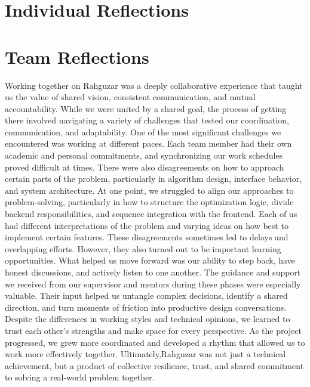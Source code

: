 \section{Individual Reflections}

\section{Team Reflections}
Working together on Rahguzar was a deeply collaborative experience that taught us the value of shared vision, consistent communication, and mutual accountability.
While we were united by a shared goal, the process of getting there involved navigating a variety of challenges that tested our coordination, communication, and adaptability. One of the most significant challenges we encountered was working at different paces. Each team member had their own academic and personal commitments, and synchronizing our work schedules proved difficult at times. There were also disagreements on how to approach certain parts of the problem, particularly in algorithm design, interface behavior, and system architecture.
At one point, we struggled to align our approaches to problem-solving, particularly in how to structure the optimization logic, divide backend responsibilities, and sequence integration with the frontend. Each of us had different interpretations of the problem and varying ideas on how best to implement certain features. These disagreements sometimes led to delays and overlapping efforts. However, they also turned out to be important learning opportunities. What helped us move forward was our ability to step back, have honest discussions, and actively listen to one another. The guidance and support we received from our supervisor and mentors during these phases were especially valuable. Their input helped us untangle complex decisions, identify a shared direction, and turn moments of friction into productive design conversations.
Despite the differences in working styles and technical opinions, we learned to trust each other’s strengths and make space for every perspective. As the project progressed, we grew more coordinated and developed a rhythm that allowed us to work more effectively together. Ultimately,Rahguzar was not just a technical achievement, but a product of collective resilience, trust, and shared commitment to solving a real-world problem together.
